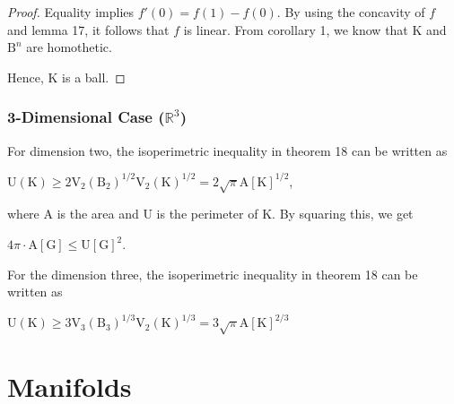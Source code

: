 \documentclass[a4paper]{book}
\numberwithin{theorem}{section}%
\begin{document}
\begin{proof}
    Equality implies $f'(0)=f(1)-f(0)$. By using the concavity of $f$ and lemma 17, it follows that $f$ is linear. From corollary 1, we know that $\mathrm{K}$ and $\mathrm{B}^{n}$ are homothetic.

    Hence, $\mathrm{K}$ is a ball.
\end{proof}

\subsection{3-Dimensional Case ($\mathbb{R}^{3}$)}
For dimension two, the isoperimetric inequality in theorem 18 can be written as
\begin{center}
$\displaystyle \mathrm{U}(\mathrm{K})\geq 2\mathrm{V}_{2}(\mathrm{B}_{2})^{1/2}\mathrm{V}_{2}(\mathrm{K})^{1/2}=2\sqrt{\pi}\mathrm{A}[\mathrm{K}]^{1/2}$,
\end{center}
where $\mathrm{A}$ is the area and $\mathrm{U}$ is the perimeter of $\mathrm{K}$. By squaring this, we get
\begin{center}
$4\pi\cdot\mathrm{A}[\mathrm{G}]\leq\mathrm{U}[\mathrm{G}]^{2}$.
\end{center}

For the dimension three, the isoperimetric inequality in theorem 18 can be written as
\begin{center}
$\displaystyle \mathrm{U}(\mathrm{K})\geq 3\mathrm{V}_{3}(\mathrm{B}_{3})^{1/3}\mathrm{V}_{2}(\mathrm{K})^{1/3}=3\sqrt{\pi}\mathrm{A}[\mathrm{K}]^{2/3}$
\end{center}

\chapter{Manifolds}


\end{document}
